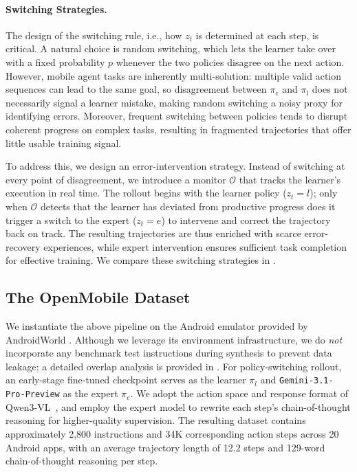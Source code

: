 \documentclass{article} %
\begin{document}
\vspace{-0.18cm}
\paragraph{Switching Strategies.}
The design of the switching rule, i.e., how $z_t$ is determined at each step, is critical.
A natural choice is random switching, which lets the learner take over with a fixed probability $p$ whenever the two policies disagree on the next action.
However, mobile agent tasks are inherently multi-solution: multiple valid action sequences can lead to the same goal, so disagreement between $\pi_e$ and $\pi_l$ does not necessarily signal a learner mistake, making random switching a noisy proxy for identifying errors.
Moreover, frequent switching between policies tends to disrupt coherent progress on complex tasks, resulting in fragmented trajectories that offer little usable training signal.

To address this, we design an error-intervention strategy.
Instead of switching at every point of disagreement, we introduce a monitor $\mathcal{O}$ that tracks the learner's execution in real time.
The rollout begins with the learner policy ($z_t = l$); only when $\mathcal{O}$ detects that the learner has deviated from productive progress does it trigger a switch to the expert ($z_t = e$) to intervene and correct the trajectory back on track.
The resulting trajectories are thus enriched with scarce error-recovery experiences, while expert intervention ensures sufficient task completion for effective training.
We compare these switching strategies in . 

\subsection{The OpenMobile Dataset}
\label{sec:dataset}

We instantiate the above pipeline on the Android emulator provided by AndroidWorld \citep{rawles2024androidworld}.
Although we leverage its environment infrastructure, we do \emph{not} incorporate any benchmark test instructions during synthesis to prevent data leakage; a detailed overlap analysis is provided in .
For policy-switching rollout, an early-stage fine-tuned checkpoint serves as the learner $\pi_l$ and \texttt{Gemini-3.1-Pro-Preview} as the expert $\pi_e$.
We adopt the action space and response format of Qwen3-VL~\citep{bai2025qwen3}, and employ the expert model to rewrite each step's chain-of-thought reasoning for higher-quality supervision.
The resulting dataset contains approximately 2,800 instructions and 34K corresponding action steps across 20 Android apps, with an average trajectory length of 12.2 steps and 129-word chain-of-thought reasoning per step.
\end{document}
